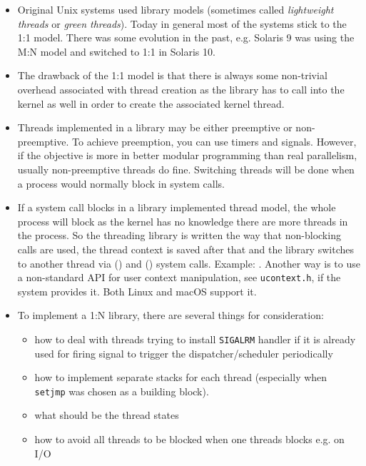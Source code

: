 \begin{itemize}
\item Original Unix systems used library models (sometimes called
\emph{lightweight threads} or \emph{green threads}). Today in general
most of the systems stick to the 1:1 model. There was some evolution in
the past, e.g. Solaris 9 was using the M:N model and switched to 1:1 in
Solaris 10.
\item The drawback of the 1:1 model is that there is always some non-trivial
overhead associated with thread creation as the library has to call into the
kernel as well in order to create the associated kernel thread.
\item Threads implemented in a library may be either preemptive or
non-pre\-emp\-tive. To achieve preemption, you can use timers and signals.
However, if the objective is more in better modular programming than real
parallelism, usually non-preemptive threads do fine.  Switching threads will be
done when a process would normally block in system calls.
\item {} If a system call blocks in a library implemented thread
model, the whole process will block as the kernel has no knowledge there are
more threads in the process.  So the threading library is written the way that
non-blocking calls are used, the thread context is saved after that and the
library switches to another thread via () and ()
system calls.  Example: .  Another way is to use a
non-standard API for user context manipulation, see \texttt{ucontext.h}, if the
system provides it.  Both Linux and macOS support it.
\item To implement a 1:N library, there are several things for consideration:
\begin{itemize}
\item how to deal with threads trying to install \texttt{SIGALRM} handler
if it is already used for firing signal to trigger the dispatcher/scheduler
periodically
\item how to implement separate stacks for each thread (especially when
\texttt{setjmp} was chosen as a building block).
\item what should be the thread states
\item how to avoid all threads to be blocked when one threads blocks e.g. on I/O
\end{itemize}
\end{itemize}

